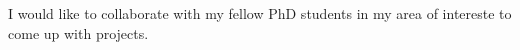 I would like to collaborate with my fellow PhD students in my area of intereste to come up with projects.
